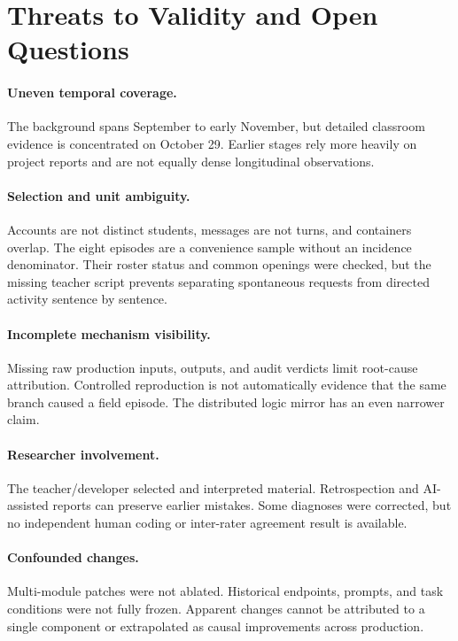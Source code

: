 \documentclass[11pt,a4paper]{article}
\begin{document}
\section{Threats to Validity and Open Questions}
\paragraph{Uneven temporal coverage.}
The background spans September to early November, but detailed classroom evidence is concentrated on October 29. Earlier stages rely more heavily on project reports and are not equally dense longitudinal observations.

\paragraph{Selection and unit ambiguity.}
Accounts are not distinct students, messages are not turns, and containers overlap. The eight episodes are a convenience sample without an incidence denominator. Their roster status and common openings were checked, but the missing teacher script prevents separating spontaneous requests from directed activity sentence by sentence.

\paragraph{Incomplete mechanism visibility.}
Missing raw production inputs, outputs, and audit verdicts limit root-cause attribution. Controlled reproduction is not automatically evidence that the same branch caused a field episode. The distributed logic mirror has an even narrower claim.

\paragraph{Researcher involvement.}
The teacher/developer selected and interpreted material. Retrospection and AI-assisted reports can preserve earlier mistakes. Some diagnoses were corrected, but no independent human coding or inter-rater agreement result is available.

\paragraph{Confounded changes.}
Multi-module patches were not ablated. Historical endpoints, prompts, and task conditions were not fully frozen. Apparent changes cannot be attributed to a single component or extrapolated as causal improvements across production.
\end{document}
